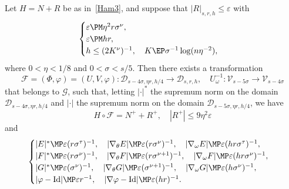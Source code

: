 \begin{proposition}\label{Pos}
Let $H=N+R$ be as in~\eqref{Ham3}, and suppose that $|R|_{s,r,h} \leq \varepsilon$ with
\begin{equation}\label{seuil}
\begin{cases}
\varepsilon \PM \eta^2 r \sigma^{\nu}, \\
\varepsilon \PM h r, \\
h \leq (2K^{\nu})^{-1}, \quad K\EP \sigma^{-1}\log(n\eta^{-2}),
\end{cases}
\end{equation}
where $0<\eta<1/8$ and $0<\sigma<s/5$. Then there exists a transformation
\[ \mathcal{F}=(\Phi,\varphi)=(U,V,\varphi) : \mathcal{D}_{s-4\sigma,\eta r,h/4} \to \mathcal{D}_{s,r,h}, \quad U_\omega^{-1} : \mathcal{V}_{s-5\sigma} \to \mathcal{V}_{s-4\sigma}\]
that belongs to $\mathcal{G}$, such that, letting $|{\cdot}|^*$ the supremum norm on the domain $\mathcal{D}_{s-4\sigma,\eta r,h/4}$ and $|{\cdot}|$ the supremum norm on the domain $\mathcal{D}_{s-5\sigma,\eta r,h/4}$, we have
\begin{equation}\label{estim1}
H \circ \mathcal{F}=N^++R^+, \quad |R^+| \leq 9\eta^2\varepsilon
\end{equation}
and
\begin{equation}\label{estim2}
\begin{cases}
|E|^* \MP \varepsilon(r\sigma^\tau)^{-1}, \quad |\nabla_\theta E| \MP \varepsilon(r\sigma^\nu)^{-1}, \quad |\nabla_\omega E| \MP \varepsilon(h r\sigma^\tau)^{-1},\\
|F|^* \MP \varepsilon(r\sigma^\nu)^{-1}, \quad |\nabla_\theta F| \MP \varepsilon(r\sigma^{\nu+1})^{-1}, \quad |\nabla_\omega F| \MP \varepsilon(h r\sigma^\nu)^{-1}, \\
|G|^* \MP \varepsilon(\sigma^\nu)^{-1}, \quad |\nabla_\theta G| \MP \varepsilon(\sigma^{\nu+1})^{-1}, \quad |\nabla_\omega G| \MP \varepsilon(h \sigma^\nu)^{-1}, \\
|\varphi-\mathrm{Id}| \MP \varepsilon r^{-1}, \quad |\nabla \varphi-\mathrm{Id}| \MP \varepsilon (h r)^{-1}.
\end{cases}
\end{equation}

\end{proposition}

